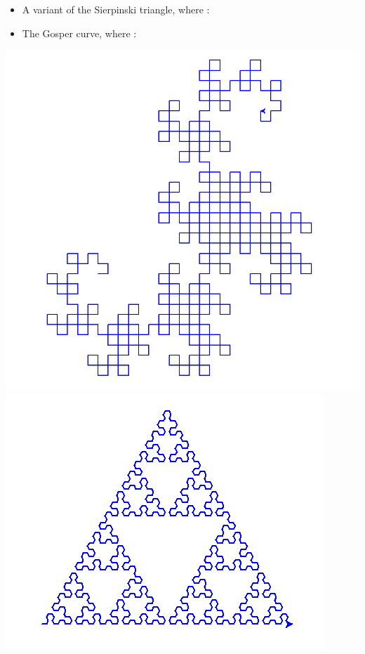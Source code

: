 \documentclass[11pt,class=report,crop=false]{standalone}
\begin{document}
\begin{activite}
\begin{enumerate}
\begin{itemize}
	\item A variant of the Sierpinski triangle, where :	

\item The Gosper curve, where :
	  
	\end{itemize}
	
\begin{center}
\includegraphics[scale=\myscale,scale=0.15]{screen-lsystems-8}\quad
\includegraphics[scale=\myscale,scale=0.33]{screen-lsystems-9}\quad

\end{center}
\end{enumerate}
\end{activite}
\end{document}
